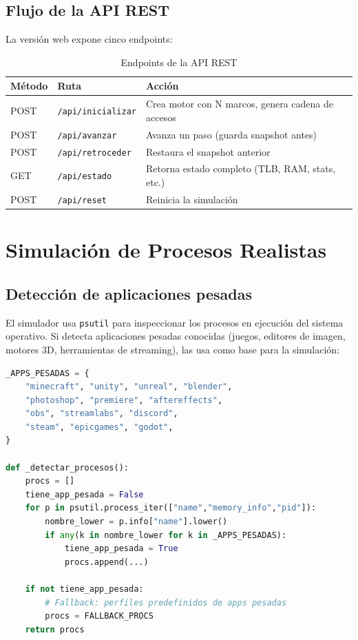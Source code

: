 \documentclass[12pt,a4paper]{article}
\begin{document}
\subsection{Flujo de la API REST}

La versión web expone cinco endpoints:

\begin{table}[H]
\centering
\begin{tabular}{lll}
\toprule
\textbf{Método} & \textbf{Ruta} & \textbf{Acción} \\
\midrule
POST & \texttt{/api/inicializar} & Crea motor con N marcos, genera cadena de accesos \\
POST & \texttt{/api/avanzar}     & Avanza un paso (guarda snapshot antes) \\
POST & \texttt{/api/retroceder}  & Restaura el snapshot anterior \\
GET  & \texttt{/api/estado}      & Retorna estado completo (TLB, RAM, stats, etc.) \\
POST & \texttt{/api/reset}       & Reinicia la simulación \\
\bottomrule
\end{tabular}
\caption{Endpoints de la API REST}
\end{table}

\newpage

\section{Simulación de Procesos Realistas}

\subsection{Detección de aplicaciones pesadas}

El simulador usa \texttt{psutil} para inspeccionar los procesos en ejecución del sistema
operativo. Si detecta aplicaciones pesadas conocidas (juegos, editores de imagen, motores
3D, herramientas de streaming), las usa como base para la simulación:

\begin{lstlisting}[language=python, caption=Detección de apps pesadas con psutil]
_APPS_PESADAS = {
    "minecraft", "unity", "unreal", "blender",
    "photoshop", "premiere", "aftereffects",
    "obs", "streamlabs", "discord",
    "steam", "epicgames", "godot",
}

def _detectar_procesos():
    procs = []
    tiene_app_pesada = False
    for p in psutil.process_iter(["name","memory_info","pid"]):
        nombre_lower = p.info["name"].lower()
        if any(k in nombre_lower for k in _APPS_PESADAS):
            tiene_app_pesada = True
            procs.append(...)

    if not tiene_app_pesada:
        # Fallback: perfiles predefinidos de apps pesadas
        procs = FALLBACK_PROCS
    return procs
\end{lstlisting}
\end{document}
